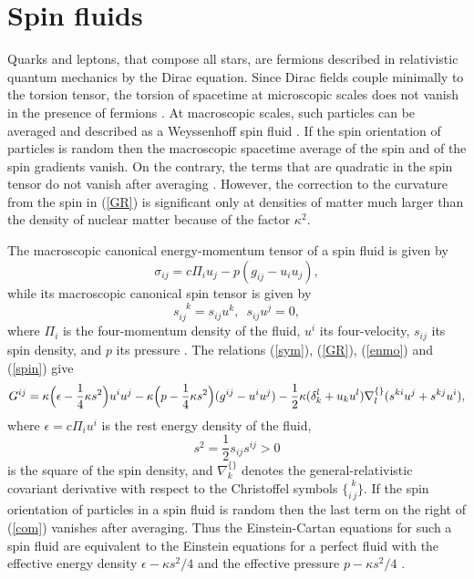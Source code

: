 \documentclass[prd,onecolumn,nofootinbib,showkeys]{revtex4}
\begin{document}
\section{Spin fluids}
Quarks and leptons, that compose all stars, are fermions described in relativistic quantum mechanics by the Dirac equation.
Since Dirac fields couple minimally to the torsion tensor, the torsion of spacetime at microscopic scales does not vanish in the presence of fermions \cite{HHKN}.
At macroscopic scales, such particles can be averaged and described as a Weyssenhoff spin fluid \cite{WR,NSH}.
If the spin orientation of particles is random then the macroscopic spacetime average of the spin and of the spin gradients vanish.
On the contrary, the terms that are quadratic in the spin tensor do not vanish after averaging \cite{HHK}.
However, the correction to the curvature from the spin in (\ref{GR}) is significant only at densities of matter much larger than the density of nuclear matter because of the factor $\kappa^2$.

The macroscopic canonical energy-momentum tensor of a spin fluid is given by
\begin{equation}
\sigma_{ij}=c\Pi_i u_j-p(g_{ij}-u_i u_j),
\label{enmo}
\end{equation}
while its macroscopic canonical spin tensor is given by
\begin{equation}
s_{ij}^{\phantom{ij}k}=s_{ij}u^k,\,\,\,s_{ij}u^j=0,
\label{spin}
\end{equation}
where $\Pi_i$ is the four-momentum density of the fluid, $u^i$ its four-velocity, $s_{ij}$ its spin density, and $p$ its pressure \cite{HHK}.
The relations (\ref{sym}), (\ref{GR}), (\ref{enmo}) and (\ref{spin}) give \cite{HHK}
\begin{equation}
G^{ij}=\kappa\Bigl(\epsilon-\frac{1}{4}\kappa s^2\Bigr)u^i u^j-\kappa\Bigl(p-\frac{1}{4}\kappa s^2\Bigr)(g^{ij}-u^i u^j)-\frac{1}{2}\kappa(\delta^l_k+u_k u^l)\nabla_l^{\{\}}(s^{ki}u^j+s^{kj}u^i),
\label{com}
\end{equation}
where $\epsilon=c\Pi_i u^i$ is the rest energy density of the fluid,
\begin{equation}
s^2=\frac{1}{2}s_{ij}s^{ij}>0
\end{equation}
is the square of the spin density, and $\nabla_k^{\{\}}$ denotes the general-relativistic covariant derivative with respect to the Christoffel symbols $\{^{\,\,k}_{i\,j}\}$.
If the spin orientation of particles in a spin fluid is random then the last term on the right of (\ref{com}) vanishes after averaging.
Thus the Einstein-Cartan equations for such a spin fluid are equivalent to the Einstein equations for a perfect fluid with the effective energy density $\epsilon-\kappa s^2/4$ and the effective pressure $p-\kappa s^2/4$ \cite{HHK,Gas,NP,BF}.
\end{document}
